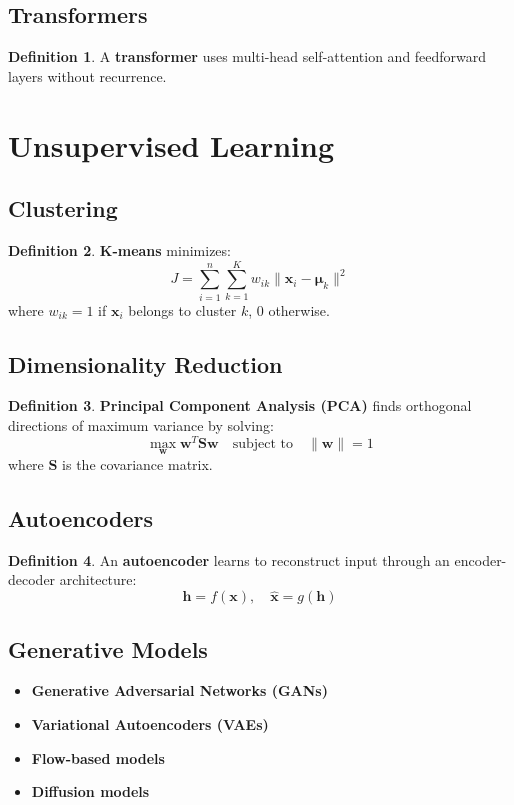 \documentclass[11pt]{article}
\theoremstyle{definition}
\newtheorem{definition}{Definition}[section]
\begin{document}
\subsection{Transformers}
\begin{definition}
A \textbf{transformer} uses multi-head self-attention and feedforward layers without recurrence.
\end{definition}

\section{Unsupervised Learning}

\subsection{Clustering}
\begin{definition}
\textbf{K-means} minimizes:
$$J = \sum_{i=1}^n \sum_{k=1}^K w_{ik} \|\mathbf{x}_i - \boldsymbol{\mu}_k\|^2$$
where $w_{ik} = 1$ if $\mathbf{x}_i$ belongs to cluster $k$, 0 otherwise.
\end{definition}

\subsection{Dimensionality Reduction}
\begin{definition}
\textbf{Principal Component Analysis (PCA)} finds orthogonal directions of maximum variance by solving:
$$\max_{\mathbf{w}} \mathbf{w}^T\mathbf{S}\mathbf{w} \quad \text{subject to} \quad \|\mathbf{w}\| = 1$$
where $\mathbf{S}$ is the covariance matrix.
\end{definition}

\subsection{Autoencoders}
\begin{definition}
An \textbf{autoencoder} learns to reconstruct input through an encoder-decoder architecture:
$$\mathbf{h} = f(\mathbf{x}), \quad \hat{\mathbf{x}} = g(\mathbf{h})$$
\end{definition}

\subsection{Generative Models}
\begin{itemize}
    \item \textbf{Generative Adversarial Networks (GANs)}
    \item \textbf{Variational Autoencoders (VAEs)}
    \item \textbf{Flow-based models}
    \item \textbf{Diffusion models}
\end{itemize}
\end{document}
